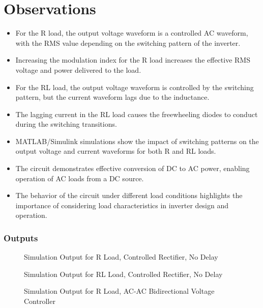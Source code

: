 \documentclass[12pt]{article}
\begin{document}
\section*{Observations}
\begin{itemize}
    \item For the R load, the output voltage waveform is a controlled AC waveform, with the RMS value depending on the switching pattern of the inverter.
    \item Increasing the modulation index for the R load increases the effective RMS voltage and power delivered to the load.
    \item For the RL load, the output voltage waveform is controlled by the switching pattern, but the current waveform lags due to the inductance.
    \item The lagging current in the RL load causes the freewheeling diodes to conduct during the switching transitions.
    \item MATLAB/Simulink simulations show the impact of switching patterns on the output voltage and current waveforms for both R and RL loads.
    \item The circuit demonstrates effective conversion of DC to AC power, enabling operation of AC loads from a DC source.
    \item The behavior of the circuit under different load conditions highlights the importance of considering load characteristics in inverter design and operation.
\end{itemize}


\subsubsection*{Outputs}
\begin{figure}[H]
    \centering
    \caption{Simulation Output for R Load, Controlled Rectifier, No Delay}
    \label{fig:rControlledNoDelay}
\end{figure}

\begin{figure}[H]
    \centering
    \caption{Simulation Output for RL Load, Controlled Rectifier, No Delay}
    \label{fig:rControlledWithDelay}
\end{figure}

\begin{figure}[H]
    \centering
    \caption{Simulation Output for R Load, AC-AC Bidirectional Voltage Controller}
    \label{fig:rLoad}
\end{figure}
\end{document}
